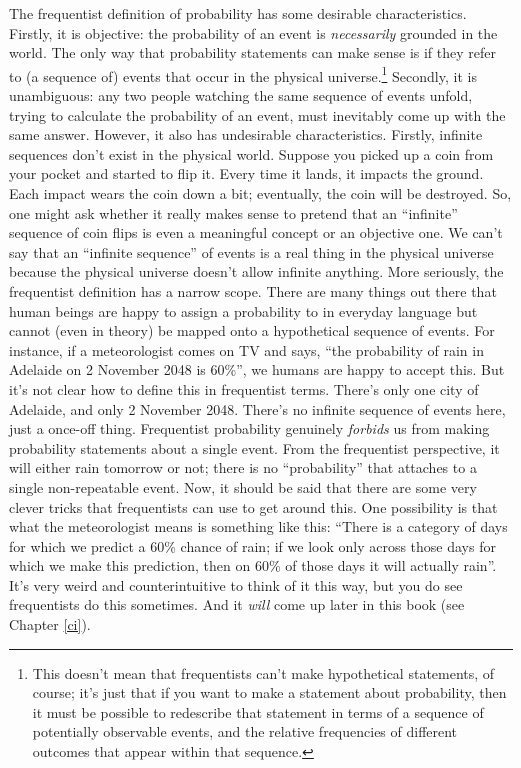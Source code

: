 \documentclass[
  11pt,
  a4paper,
  twoside,symmetric,openright]{book}
\theoremstyle{break}
\theoremstyle{break}
\begin{document}
The frequentist definition of probability has some desirable characteristics. Firstly, it is objective: the probability of an event is \emph{necessarily} grounded in the world. The only way that probability statements can make sense is if they refer to (a sequence of) events that occur in the physical universe.\footnote{This doesn't mean that frequentists can't make hypothetical statements, of course; it's just that if you want to make a statement about probability, then it must be possible to redescribe that statement in terms of a sequence of potentially observable events, and the relative frequencies of different outcomes that appear within that sequence.} Secondly, it is unambiguous: any two people watching the same sequence of events unfold, trying to calculate the probability of an event, must inevitably come up with the same answer. However, it also has undesirable characteristics. Firstly, infinite sequences don't exist in the physical world. Suppose you picked up a coin from your pocket and started to flip it. Every time it lands, it impacts the ground. Each impact wears the coin down a bit; eventually, the coin will be destroyed. So, one might ask whether it really makes sense to pretend that an ``infinite'' sequence of coin flips is even a meaningful concept or an objective one. We can't say that an ``infinite sequence'' of events is a real thing in the physical universe because the physical universe doesn't allow infinite anything. More seriously, the frequentist definition has a narrow scope. There are many things out there that human beings are happy to assign a probability to in everyday language but cannot (even in theory) be mapped onto a hypothetical sequence of events. For instance, if a meteorologist comes on TV and says, ``the probability of rain in Adelaide on 2 November 2048 is 60\%'', we humans are happy to accept this. But it's not clear how to define this in frequentist terms. There's only one city of Adelaide, and only 2 November 2048. There's no infinite sequence of events here, just a once-off thing. Frequentist probability genuinely \emph{forbids} us from making probability statements about a single event. From the frequentist perspective, it will either rain tomorrow or not; there is no ``probability'' that attaches to a single non-repeatable event. Now, it should be said that there are some very clever tricks that frequentists can use to get around this. One possibility is that what the meteorologist means is something like this: ``There is a category of days for which we predict a 60\% chance of rain; if we look only across those days for which we make this prediction, then on 60\% of those days it will actually rain''. It's very weird and counterintuitive to think of it this way, but you do see frequentists do this sometimes. And it \emph{will} come up later in this book (see Chapter \ref{ci}).
\end{document}
